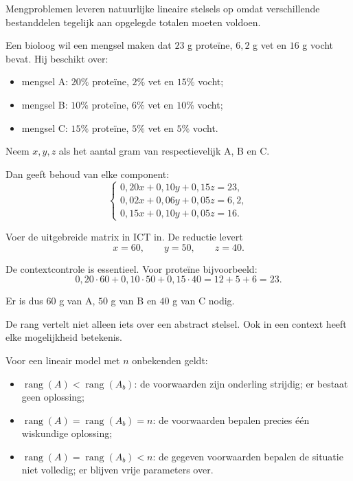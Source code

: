 \documentclass{ximera}
\begin{document}

Mengproblemen leveren natuurlijke lineaire stelsels op omdat verschillende
bestanddelen tegelijk aan opgelegde totalen moeten voldoen.

\begin{voorbeeld}[Voedingsmengsel]

Een bioloog wil een mengsel maken dat \(23\) g proteïne, \(6{,}2\) g vet
en \(16\) g vocht bevat. Hij beschikt over:

\begin{itemize}
  \item mengsel A: \(20\%\) proteïne, \(2\%\) vet en \(15\%\) vocht;
  \item mengsel B: \(10\%\) proteïne, \(6\%\) vet en \(10\%\) vocht;
  \item mengsel C: \(15\%\) proteïne, \(5\%\) vet en \(5\%\) vocht.
\end{itemize}

Neem \(x,y,z\) als het aantal gram van respectievelijk A, B en C.

Dan geeft behoud van elke component:
\[
\begin{cases}
0{,}20x+0{,}10y+0{,}15z=23,\\
0{,}02x+0{,}06y+0{,}05z=6{,}2,\\
0{,}15x+0{,}10y+0{,}05z=16.
\end{cases}
\]

Voer de uitgebreide matrix in ICT in. De reductie levert
\[
x=60,\qquad y=50,\qquad z=40.
\]

De contextcontrole is essentieel. Voor proteïne bijvoorbeeld:
\[
0{,}20\cdot60+0{,}10\cdot50+0{,}15\cdot40
=12+5+6=23.
\]

Er is dus \(60\) g van A, \(50\) g van B en \(40\) g van C nodig.
\end{voorbeeld}




De rang vertelt niet alleen iets over een abstract stelsel.
Ook in een context heeft elke mogelijkheid betekenis.

\begin{eigenschap}
Voor een lineair model met \(n\) onbekenden geldt:

\begin{itemize}
  \item \(\operatorname{rang}(A)<\operatorname{rang}(A_b)\):
        de voorwaarden zijn onderling strijdig; er bestaat geen oplossing;
  \item \(\operatorname{rang}(A)=\operatorname{rang}(A_b)=n\):
        de voorwaarden bepalen precies één wiskundige oplossing;
  \item \(\operatorname{rang}(A)=\operatorname{rang}(A_b)<n\):
        de gegeven voorwaarden bepalen de situatie niet volledig;
        er blijven vrije parameters over.
\end{itemize}
\end{eigenschap}
\end{document}
